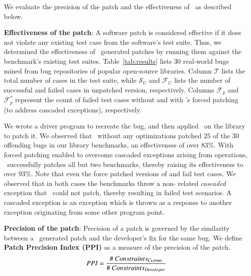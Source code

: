 We evaluate the precision of the patch and the effectiveness of \tool\ as
described below.

\begin{mylist}

\item \textbf{Effectiveness of the patch}: A software patch is considered
effective if it does not violate any existing test case from the software's test
suite. Thus, we determined the effectiveness of \tool\ generated patches by
running them against the benchmark's existing test suites.
Table~\ref{tab:results} lists $30$ real-world bugs mined from bug repositories
of popular open-source libraries. Column $\mathcal{T}$ lists the total number
of cases in the test suite, while $\mathcal{S}_{U}$ and $\mathcal{F}_{U}$ lists
the number of successful and failed cases in unpatched version, respectively.
Columns $\mathcal{F}_{p}$ and $\mathcal{F}_{p}^{*}$ represent the count of
failed test cases without and with \tool{}'s forced patching (to address
cascaded exceptions), respectively.

We wrote a driver program to recreate the bug, and then applied \tool\ on the
library to patch it. We observed that \tool\ without any optimizations patched
$25$ of the $30$ offending bugs in our library benchmarks, an effectiveness of
over $83\%$. With forced patching enabled to overcome cascaded exceptions arising
from  operations, \tool\ successfully patches all but two
benchmarks, thereby raising its effectiveness to over $93$\%. Note that even the
force patched versions of  and 
fail test cases. We observed that in both cases the benchmarks throw a
non- related \textit{cascaded} exception that \tool\ could not patch,
thereby resulting in failed test scenarios. A cascaded exception is an
exception which is thrown as a response to another exception originating 
from some other program point. 

\item \textbf{Precision of the patch}: Precision of a patch is governed by the
similarity between a \tool\ generated patch and the developer's fix for the same
bug. We define \textbf{Patch Precision Index (PPI)} as a measure of the
precision of the patch.
$$PPI = \frac{\#~Constraints_{\textsc{Clotho}}}{\#~Constraints_{Developer}}$$


\end{mylist}
